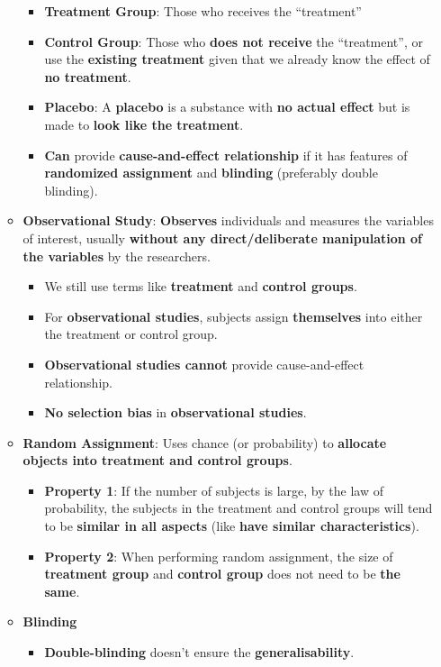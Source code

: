\documentclass[10pt, landscape]{article}
\begin{document}
\begin{multicols}{4}
\begin{enumerate}
\begin{itemize}
        \begin{itemize}
            \item \textbf{Treatment Group}: Those who receives the ``treatment''
            \item \textbf{Control Group}: Those who \textbf{does not receive} the ``treatment'', or use the \textbf{existing treatment} given that we already know the effect of \textbf{no treatment}.
            \item \textbf{Placebo}: A \textbf{placebo} is a substance with \textbf{no actual effect} but is made to \textbf{look like the treatment}.
            \item \textbf{Can} provide \textbf{cause-and-effect relationship} if it has features of \textbf{randomized assignment} and \textbf{blinding} (preferably double blinding).
        \end{itemize}
        \item \textbf{Observational Study}: \textbf{Observes} individuals and measures the variables of interest, usually \textbf{without any direct/deliberate manipulation of the variables} by the researchers.
        \begin{itemize}
            \item We still use terms like \textbf{treatment} and \textbf{control groups}.
            \item For \textbf{observational studies}, subjects assign \textbf{themselves} into either the treatment or control group.
            \item \textbf{Observational studies cannot} provide cause-and-effect relationship.
            \item \textbf{No selection bias} in \textbf{observational studies}.
        \end{itemize}
        \item \textbf{Random Assignment}: Uses chance (or probability) to \textbf{allocate objects into treatment and control groups}.
        \begin{itemize}
            \item \textbf{Property 1}: If the number of subjects is large, by the law of probability, the subjects in the treatment and control groups will tend to be \textbf{similar in all aspects} (like \textbf{have similar characteristics}).
            \item \textbf{Property 2}: When performing random assignment, the size of \textbf{treatment group} and \textbf{control group} does not need to be \textbf{the same}.
        \end{itemize}
        \item \textbf{Blinding}
        \begin{itemize}
            \item \textbf{Double-blinding} doesn't ensure the \textbf{generalisability}.
        \end{itemize}
    \end{itemize}
\end{enumerate}


\end{multicols}
\end{document}
